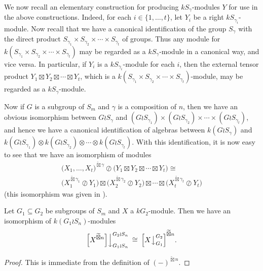 \documentclass[ALCO,Unicode,published]{cedram}
\begin{document}
We now recall an elementary construction for producing $kS_{\gamma}$-modules $Y$ for use in the above constructions. Indeed, for each
$i \in \{1,\ldots,t\}$, let $Y_i$ be a right $kS_{\gamma_i}$-module. Now recall that we have a canonical identification of the group
$S_{\gamma}$ with the direct product $S_{\gamma_1}\times S_{\gamma_2}\times\cdots\times S_{\gamma_t}$ of groups. Thus any module for
$k(S_{\gamma_1}{\times}S_{\gamma_2}{\times}\cdots{\times}S_{\gamma_t})$ may be regarded as a $kS_{\gamma}$-module in a canonical way, and vice
versa. In particular, if $Y_i$ is a $kS_{\gamma_i}$-module for each $i$, then the external tensor product
$Y_1 \boxtimes Y_2 \boxtimes \cdots \boxtimes Y_t$, which is a
$k\left(S_{\gamma_1}\times S_{\gamma_2}\times\cdots\times S_{\gamma_t}\right)$-module, may be regarded as a $kS_{\gamma}$-module.

Now if $G$ is a subgroup of $S_m$ and $\gamma$ is a composition of $n$, then we have an obvious isomorphism between $G{\wr}S_{\gamma}$ and 
$\left(G{\wr}S_{\gamma_1}\right)\times\left(G{\wr}S_{\gamma_2}\right)\times\cdots\times\left(G{\wr}S_{\gamma_t}\right)$, and hence we have a
canonical identification of algebras between $k(G{\wr}S_{\gamma})$ and
$k\left(G{\wr}S_{\gamma_1}\right)\otimes k\left(G{\wr}S_{\gamma_2}\right)\otimes\cdots \otimes k\left(G{\wr}S_{\gamma_t}\right)$.
With this identification, it is now easy to see that we have an isomorphism of modules
\begin{multline}\label{mod_wprd_etp_vrs:eq}
\bigl(X_1,\ldots,X_t\bigr)^{\widetilde\boxtimes\gamma} {\oslash}\bigl(Y_1 \boxtimes Y_2 \boxtimes \cdots\boxtimes Y_t\bigr)
\cong\\
	\bigl(X_1^{\widetilde\boxtimes \gamma_1}\oslash Y_1\bigr)\boxtimes
	\bigl(X_2^{\widetilde\boxtimes \gamma_2}\oslash Y_2\bigr)\boxtimes\cdots
	\boxtimes\bigl(X_t^{\widetilde\boxtimes \gamma_t}\oslash Y_t\bigr)
\end{multline}
(this isomorphism was given in \cite[Lemma 3.2 (1)]{CHTAN}).

\begin{prop}\label{res_comm_tilde_boxtimes:prop}
Let $G_1 \subseteq G_2$ be subgroups of $S_m$ and $X$ a $kG_2$-module. Then we have an isomorphism of $k(G_1 \wr S_n)$-modules
\[
\Bigl[X^{\widetilde\boxtimes n}\Bigr]\Bigr\downarrow^{G_2 \wr S_n}_{G_1 \wr S_n} \:\cong\:
\Bigl[X\bigr\downarrow^{G_2}_{G_1}\Bigl]^{\widetilde\boxtimes n}.
\]
\end{prop}
\begin{proof}
This is immediate from the definition of $(-)^{\widetilde\boxtimes n}$.
\end{proof}
\end{document}
